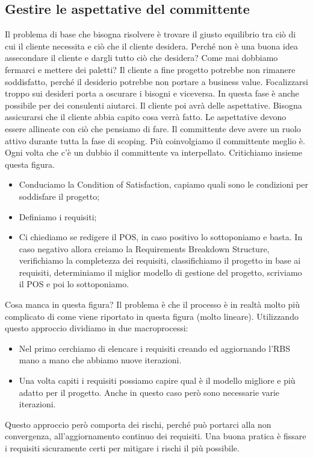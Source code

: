 \subsection{Gestire le aspettative del committente}
Il problema di base che bisogna risolvere è trovare il giusto equilibrio tra ciò di cui il cliente necessita e ciò che il cliente desidera. Perché non è una buona idea assecondare il cliente e dargli tutto ciò che desidera? Come mai dobbiamo fermarci e mettere dei paletti?\newline
Il cliente a fine progetto potrebbe non rimanere soddisfatto, perché il desiderio potrebbe non portare a business value. Focalizzarsi troppo sui desideri porta a oscurare i bisogni e viceversa. In questa fase è anche possibile per dei consulenti aiutarci. Il cliente poi avrà delle aspettative. Bisogna assicurarsi che il cliente abbia capito cosa verrà fatto. Le aspettative devono essere allineate con ciò che pensiamo di fare. Il committente deve avere un ruolo attivo durante tutta la fase di scoping. Più coinvolgiamo il committente meglio è. Ogni volta che c'è un dubbio il committente va interpellato.
\noindent Critichiamo insieme questa figura.
\begin{itemize}
	\item Conduciamo la Condition of Satisfaction, capiamo quali sono le condizioni per soddisfare il progetto;
	\item Definiamo i requisiti;
	\item Ci chiediamo se redigere il POS, in caso positivo lo sottoponiamo e basta. In caso negativo allora creiamo la Requirements Breakdown Structure, verifichiamo la completezza dei requisiti, classifichiamo il progetto in base ai requisiti, determiniamo il miglior modello di gestione del progetto, scriviamo il POS e poi lo sottoponiamo.
\end{itemize}
Cosa manca in questa figura? Il problema è che il processo è in realtà molto più complicato di come viene riportato in questa figura (molto lineare).
\noindent Utilizzando questo approccio dividiamo in due macroprocessi:
\begin{itemize}
	\item Nel primo cerchiamo di elencare i requisiti creando ed aggiornando l'RBS mano a mano che abbiamo nuove iterazioni.
	\item Una volta capiti i requisiti possiamo capire qual è il modello migliore e più adatto per il progetto. Anche in questo caso però sono necessarie varie iterazioni.
\end{itemize}
Questo approccio però comporta dei rischi, perché può portarci alla non convergenza, all'aggiornamento continuo dei requisiti. Una buona pratica è fissare i requisiti sicuramente certi per mitigare i rischi il più possibile.
